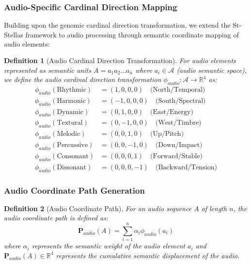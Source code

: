 \documentclass[12pt,a4paper]{article}
\newtheorem{definition}{Definition}
\begin{document}
\subsubsection{Audio-Specific Cardinal Direction Mapping}

Building upon the genomic cardinal direction transformation, we extend the St-Stellas framework to audio processing through semantic coordinate mapping of audio elements:

\begin{definition}[Audio Cardinal Direction Transformation]
For audio elements represented as semantic units $A = a_1a_2...a_n$ where $a_i \in \mathcal{A}$ (audio semantic space), we define the audio cardinal direction transformation $\phi_{audio}: \mathcal{A} \to \mathbb{R}^4$ as:
\begin{align}
\phi_{audio}(\text{Rhythmic}) &= (1, 0, 0, 0) \quad \text{(North/Temporal)} \\
\phi_{audio}(\text{Harmonic}) &= (-1, 0, 0, 0) \quad \text{(South/Spectral)} \\
\phi_{audio}(\text{Dynamic}) &= (0, 1, 0, 0) \quad \text{(East/Energy)} \\
\phi_{audio}(\text{Textural}) &= (0, -1, 0, 0) \quad \text{(West/Timbre)} \\
\phi_{audio}(\text{Melodic}) &= (0, 0, 1, 0) \quad \text{(Up/Pitch)} \\
\phi_{audio}(\text{Percussive}) &= (0, 0, -1, 0) \quad \text{(Down/Impact)} \\
\phi_{audio}(\text{Consonant}) &= (0, 0, 0, 1) \quad \text{(Forward/Stable)} \\
\phi_{audio}(\text{Dissonant}) &= (0, 0, 0, -1) \quad \text{(Backward/Tension)}
\end{align}
\end{definition}

\subsubsection{Audio Coordinate Path Generation}

\begin{definition}[Audio Coordinate Path]
For an audio sequence $A$ of length $n$, the audio coordinate path is defined as:
\begin{equation}
\mathbf{P}_{audio}(A) = \sum_{i=1}^n \alpha_i \phi_{audio}(a_i)
\end{equation}
where $\alpha_i$ represents the semantic weight of the audio element $a_i$ and $\mathbf{P}_{audio}(A) \in \mathbb{R}^4$ represents the cumulative semantic displacement of the audio.
\end{definition}
\end{document}
